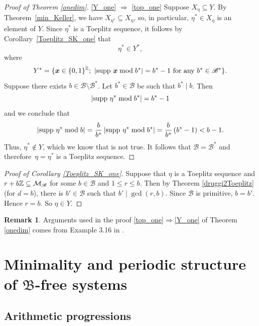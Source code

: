 \documentclass[leqno,a4paper,12pt]{article}
\theoremstyle{definition}
\newtheorem{Remark}[Th]{Remark}
\newcommand{\cm}{{\cal M}}
\newcommand{\Z}{{\mathbb{Z}}}
\newcommand{\sB}{\mathscr{B}}
\def\supp{{\rm supp }}
\begin{document}
\begin{proof}[Proof of Theorem \ref{onedim}]
\eqref{Y_one} $\Rightarrow$ \eqref{top_one} Suppose $X_\eta\subseteq Y$. By Theorem~\ref{min_Keller}, we have $X_{\eta^*}\subseteq X_\eta$, so, in particular, $\eta^*\in X_\eta$ is an element of $Y$. Since $\eta^*$ is a Toeplitz sequence, it follows by Corollary~\ref{Toeplitz_SK_one} that \[\eta^*\in Y^*,\]where
\[
Y^*=\{\bm{x}\in\{0,1\}^{\Z};\ |\supp \ \bm{x}\bmod b^*|=b^*-1 \text{ for any }b^*\in\sB^*\}.
\]
Suppose there exists $b\in\sB\setminus \sB^*$. Let $b^*\in\sB$ be such that $b^*\mid b$. Then
\[
|\supp \ \eta^* \bmod b^*|=b^*-1
\]
and we conclude that
\[
\left|\supp \ \eta^* \bmod b\right|=\frac{b}{b^*}\left|\supp \ \eta^* \bmod b^*\right|=\frac{b}{b^*}\left(b^*-1\right)<b-1.
\]
Thus, $\eta^*\not\in Y$, which we know that is not true. It follows that $\sB=\sB^*$ and therefore~$\eta=\eta^*$ is a Toeplitz sequence.
\end{proof}
\begin{proof}[Proof of Corollary \ref{Toeplitz_SK_one}]
Suppose that $\eta$ is a Toeplitz sequence and $r+b\Z\subseteq\cm_\sB$ for some $b\in\sB$ and $1\leq r\leq b$. Then by Theorem \ref{druggi2Toeplitz} (for $d=b$), there is $b'\in\sB$ such that $b'\mid\gcd(r,b)$. Since $\sB$ is primitive, $b=b'$. Hence $r=b$. So $\eta\in Y$.
\end{proof}
\begin{Remark}
Arguments used in the proof \eqref{top_one}$\Rightarrow$\eqref{Y_one} of Theorem \ref{onedim} comes from Example 3.16 in \cite{MR3803141}.
\end{Remark}



\section{Minimality and periodic structure of $\mathfrak{B}$-free systems}\label{se4}
\subsection{Arithmetic progressions}
\end{document}
